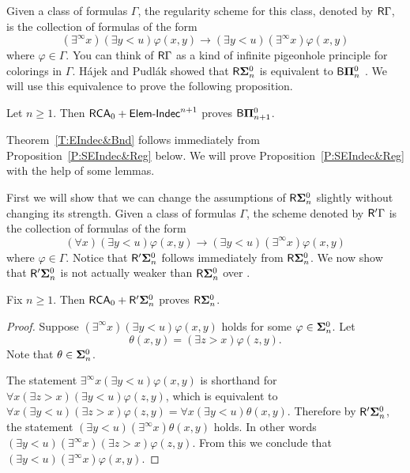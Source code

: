 Given a class of formulas $\Gamma$, the regularity scheme for
this class, denoted by $\mathsf{R}{\Gamma}$, is the collection of formulas
of the form
\begin{equation*}
  (\exists^\infty x)(\exists y<u)\varphi(x,y) \rightarrow (\exists y<u)(\exists^\infty x)\varphi(x,y)
\end{equation*}
where $\varphi\in\Gamma$.
You can think of $\mathsf{R}{\Gamma}$ as a kind of infinite pigeonhole principle
for colorings in $\Gamma$.
H{\'a}jek and Pudl{\'a}k showed that $\mathsf{R}{\mathbf{\Sigma}^0_n}$ is equivalent to $\mathsf{B}{\mathbf{\Pi}^0_n}$ \cite{Hajek&Pudlak}.
We will use this equivalence to prove the following proposition.

\begin{thm}\label{T:EIndec&Bnd}
Let $n\geq1$.  Then $\mathsf{RCA}_0+\mathsf{Elem{\mbox{-}}Indec}^{n+1}$ proves $\mathsf{B}{\mathbf{\Pi}^0_{n+1}}$.
\end{thm}

Theorem~\ref{T:EIndec&Bnd} follows immediately from
Proposition~\ref{P:SEIndec&Reg} below.
We will prove Proposition~\ref{P:SEIndec&Reg} with the help of some lemmas.

First we will show that we can change the assumptions of $\mathsf{R}{\mathbf{\Sigma}^0_n}$
slightly without changing its strength.
Given a class of formulas $\Gamma$, the scheme denoted by $\mathsf{R}{'}{\Gamma}$
is the collection of formulas of the form
\begin{equation*}
  (\forall x)(\exists y<u)\varphi(x,y) \rightarrow (\exists y<u)(\exists^\infty x)\varphi(x,y)
\end{equation*}
where $\varphi\in\Gamma$.
Notice that $\mathsf{R}{'}{\mathbf{\Sigma}^0_n}$ follows immediately from $\mathsf{R}{\mathbf{\Sigma}^0_n}$.
We now show that $\mathsf{R}{'}{\mathbf{\Sigma}^0_n}$ is not actually weaker than $\mathsf{R}{\mathbf{\Sigma}^0_n}$ over \RCAo.

\begin{lem}\label{P:RisR'}
Fix $n\geq 1$.  Then $\mathsf{RCA}_0+\mathsf{R}{'}{\mathbf{\Sigma}^0_n}$ proves $\mathsf{R}{\mathbf{\Sigma}^0_n}$.
\end{lem}
\begin{proof}
Suppose $(\exists^\infty x)(\exists y<u)\varphi(x,y)$ holds for some $\varphi\in\mathbf{\Sigma}^0_n$.
Let
$$\theta(x,y)=(\exists z> x)\varphi(z,y).$$
Note that $\theta\in\mathbf{\Sigma}^0_n$.

The statement $\exists^\infty x(\exists y<u)\varphi(x,y)$
is shorthand for $\forall x(\exists z>x)(\exists y<u)\varphi(z,y)$, which is equivalent to
$\forall x(\exists y<u)(\exists z>x)\varphi(z,y)=\forall x(\exists y<u)\theta(x,y)$.
Therefore by $\mathsf{R}'{\mathbf{\Sigma}^0_n}$, the statement
$(\exists y<u)(\exists^\infty{x})\theta(x,y)$ holds.
In other words $(\exists y<u)(\exists^\infty{x})(\exists z>x)\varphi(z,y)$.
From this we conclude that $(\exists y<u)(\exists^\infty{x})\varphi(x,y)$.
\end{proof}

